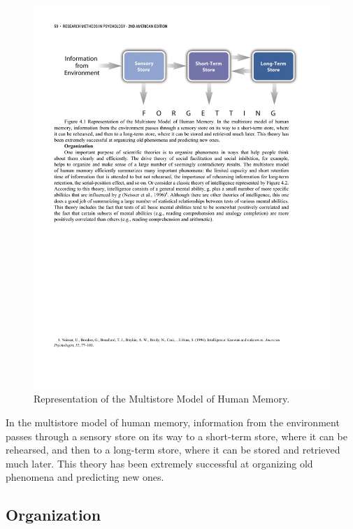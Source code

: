 \begin{figure}

      \includegraphics[width=\linewidth]{figures/C4Memory.pdf}

      \caption{Representation of the Multistore Model of Human Memory.}

      \label{fig:Memory}

\end{figure}


In the multistore model of human memory, information from the environment passes through a sensory store on its way to a short-term store, where it can be rehearsed, and then to a long-term store, where it can be stored and retrieved much later. This theory has been extremely successful at organizing old phenomena and predicting new ones.

\subsection{Organization}

